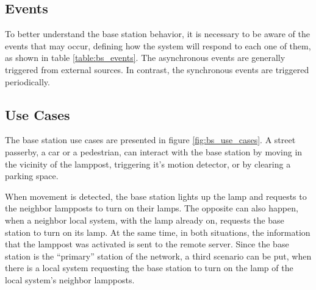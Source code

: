\subsection{Events}
To better understand the base station behavior, it is necessary to be aware of the events that may occur, defining how the system will respond to each one of them, as shown in table \ref{table:bs_events}. The asynchronous events are generally triggered from external sources. In contrast, the synchronous events are triggered periodically.

\begin{table}[h]
	\centering
	
	\caption{Base station events.}
	\label{table:bs_events}
\end{table}

\subsection{Use Cases}
The base station use cases are presented in figure \ref{fig:bs_use_cases}. A street passerby, a car or a pedestrian, can interact with the base station by moving in the vicinity of the lamppost, triggering it's motion detector, or by clearing a parking space.

When movement is detected, the base station lights up the lamp and requests to the neighbor lampposts to turn on their lamps. The opposite can also happen, when a neighbor local system, with the lamp already on, requests the base station to turn on its lamp. At the same time, in both situations, the information that the lamppost was activated is sent to the remote server. Since the base station is the “primary” station of the network, a third scenario can be put, when there is a local system requesting the base station to turn on the lamp of the local system's neighbor lampposts.

